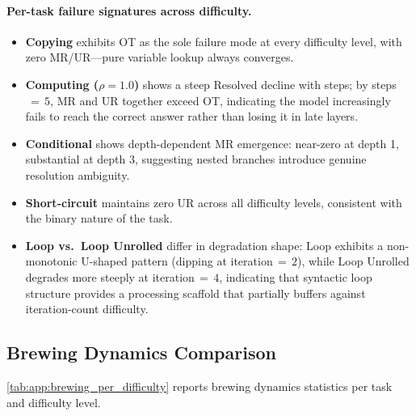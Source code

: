 \paragraph{Per-task failure signatures across difficulty.}

\begin{itemize}
\item \textbf{Copying} exhibits OT as the sole failure mode at every difficulty level, with zero MR/UR---pure variable lookup always converges.

\item \textbf{Computing ($\rho{=}1.0$)} shows a steep Resolved decline with steps; by steps$\,{=}\,5$, MR and UR together exceed OT, indicating the model increasingly fails to reach the correct answer rather than losing it in late layers.

\item \textbf{Conditional} shows depth-dependent MR emergence: near-zero at depth 1, substantial at depth 3, suggesting nested branches introduce genuine resolution ambiguity.

\item \textbf{Short-circuit} maintains zero UR across all difficulty levels, consistent with the binary nature of the task.

\item \textbf{Loop vs.\ Loop Unrolled} differ in degradation shape: Loop exhibits a non-monotonic U-shaped pattern (dipping at iteration$\,{=}\,2$), while Loop Unrolled degrades more steeply at iteration$\,{=}\,4$, indicating that syntactic loop structure provides a processing scaffold that partially buffers against iteration-count difficulty.
\end{itemize}


\subsection{Brewing Dynamics Comparison}
\label{app:subsec:brewing_dynamics_comparison}

\cref{tab:app:brewing_per_difficulty} reports brewing dynamics statistics per task and difficulty level.

